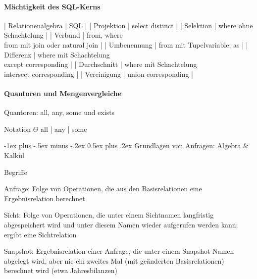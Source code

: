 \documentclass[a4paper]{article}
\makeatletter
\renewcommand{\section}{\@startsection{section}{1}{0mm}%
                                {-1ex plus -.5ex minus -.2ex}%
                                {0.5ex plus .2ex}%
                                {\normalfont\large\bfseries}}
\makeatother
\begin{document}
\begin{multicols}{3}
    \paragraph{Mächtigkeit des SQL-Kerns}
    | Relationenalgebra  | SQL |
    | Projektion | select distinct |
    | Selektion | where ohne Schachtelung |
    | Verbund | from, where\\ from mit join oder natural join |
    | Umbenennung | from mit Tupelvariable; as |
    | Differenz | where mit Schachtelung\\ except corresponding |
    | Durchschnitt | where mit Schachtelung\\ intersect corresponding |
    | Vereinigung | union corresponding |




    \paragraph{Quantoren und Mengenvergleiche}
    \begin{itemize*}
        \item Quantoren: all, any, some und exists
        \item Notation $\Theta$ { all | any | some } 
    \end{itemize*}

    \section{Grundlagen von Anfragen: Algebra \& Kalkül}

    Begriffe
    \begin{itemize*}
        \item Anfrage: Folge von Operationen, die aus den Basisrelationen eine Ergebnisrelation berechnet
        \item Sicht: Folge von Operationen, die unter einem Sichtnamen langfristig abgespeichert wird und unter diesem Namen wieder aufgerufen werden kann; ergibt eine Sichtrelation
        \item Snapshot: Ergebnisrelation einer Anfrage, die unter einem Snapshot-Namen abgelegt wird, aber nie ein zweites Mal (mit geänderten Basisrelationen) berechnet wird (etwa Jahresbilanzen)
    \end{itemize*}


\end{multicols}
\end{document}
